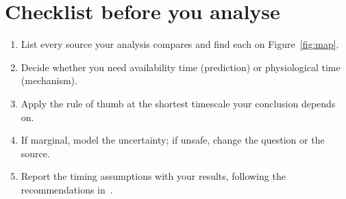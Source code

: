 \documentclass[11pt,a4paper]{article}
\begin{document}
\section{Checklist before you analyse}
\begin{enumerate}
\item List every source your analysis compares and find each on Figure~\ref{fig:map}.
\item Decide whether you need availability time (prediction) or physiological time (mechanism).
\item Apply the rule of thumb at the shortest timescale your conclusion depends on.
\item If marginal, model the uncertainty; if unsafe, change the question or the source.
\item Report the timing assumptions with your results, following the recommendations in~\cite{goodwin2022timing}.
\end{enumerate}



\end{document}
